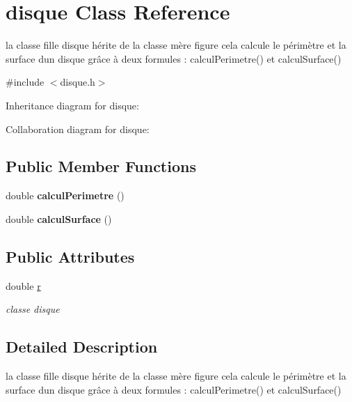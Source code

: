 \hypertarget{classdisque}{}\section{disque Class Reference}
\label{classdisque}


la classe fille disque hérite de la classe mère figure cela calcule le périmètre et la surface d\textquotesingle{}un disque grâce à deux formules \+: calcul\+Perimetre() et calcul\+Surface()  




{\ttfamily \#include $<$disque.\+h$>$}



Inheritance diagram for disque\+:


Collaboration diagram for disque\+:
\subsection*{Public Member Functions}
\begin{DoxyCompactItemize}
\item 
\mbox{\label{classdisque_ab4c79026258095fa1c9e600ca1cb582e}} 
double {\bfseries calcul\+Perimetre} ()
\item 
\mbox{\label{classdisque_af8b18e502dadee7bcd189828ac54662c}} 
double {\bfseries calcul\+Surface} ()
\end{DoxyCompactItemize}
\subsection*{Public Attributes}
\begin{DoxyCompactItemize}
\item 
double \hyperlink{classdisque_aa9813a9b5bb721cedf22e425706a2270}{r}
\begin{DoxyCompactList}\small\item\em classe disque \end{DoxyCompactList}\end{DoxyCompactItemize}


\subsection{Detailed Description}
la classe fille disque hérite de la classe mère figure cela calcule le périmètre et la surface d\textquotesingle{}un disque grâce à deux formules \+: calcul\+Perimetre() et calcul\+Surface() 

